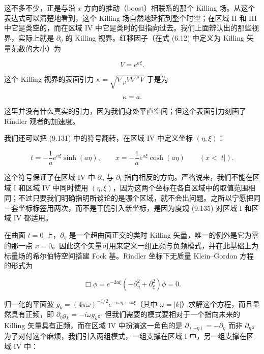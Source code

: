 这不多不少，正是与沿 $x$ 方向的推动（boost）相联系的那个 Killing 场。从这个表达式可以清楚地看到，这个 Killing 场自然地延拓到整个时空；在区域 II 和 III 中它是类空的，而在区域 IV 中它是类时的但指向过去。我们上面辨认出的那些视界，实际上就是 $\partial_{\eta}$ 的 Killing 视界。红移因子（在式 (6.12) 中定义为 Killing 矢量范数的大小）为

\begin{equation*}
V = e^{a\xi}.
\tag{9.137}
\end{equation*}

这个 Killing 视界的表面引力 $\kappa=\sqrt{\nabla_{\mu}V\nabla^{\mu}V}$ 于是为

\begin{equation*}
\kappa = a.
\tag{9.138}
\end{equation*}

这里并没有什么真实的引力，因为我们身处平直空间；但这个表面引力刻画了 Rindler 观者的加速度。

我们还可以把 (9.131) 中的符号翻转，在区域 IV 中定义坐标 $(\eta,\xi)$：

\begin{equation*}
t = -\frac{1}{a}e^{a\xi}\sinh(a\eta), \qquad x = -\frac{1}{a}e^{a\xi}\cosh(a\eta) \qquad (x < |t|).
\tag{9.139}
\end{equation*}

这个符号保证了在区域 IV 中 $\partial_{\eta}$ 与 $\partial_t$ 指向相反的方向。严格说来，我们不能在区域 I 和区域 IV 中同时使用 $(\eta,\xi)$，因为这两个坐标在各自区域中的取值范围相同；不过只要我们明确指明所谈论的是哪个区域，就不会出问题。之所以宁愿把同一套坐标标签用两次，而不是干脆引入新坐标，是因为度规 (9.135) 对区域 I 和区域 IV 都适用。

在曲面 $t=0$ 上，$\partial_{\eta}$ 是一个超曲面正交的类时 Killing 矢量，唯一的例外是它为零的那一点 $x=0$。因此这个矢量可用来定义一组正频与负频模式，并在此基础上为标量场的希尔伯特空间搭建 Fock 基。Rindler 坐标下无质量 Klein--Gordon 方程的形式为

\begin{equation*}
\Box\phi = e^{-2a\xi}\left(-\partial_{\eta}^{2} + \partial_{\xi}^{2}\right)\phi = 0.
\tag{9.140}
\end{equation*}

归一化的平面波 $g_k = (4\pi\omega)^{-1/2}e^{-i\omega\eta+ik\xi}$（其中 $\omega=|k|$）求解这个方程，而且显然具有正频，即 $\partial_{\eta}g_k=-i\omega g_k$。但我们需要的模式要相对于一个指向未来的 Killing 矢量具有正频，而在区域 IV 中扮演这一角色的是 $\partial_{(-\eta)}=-\partial_{\eta}$ 而非 $\partial_{\eta}$。为了对付这个麻烦，我们引入两组模式，一组支撑在区域 I 中，另一组支撑在区域 IV 中：

